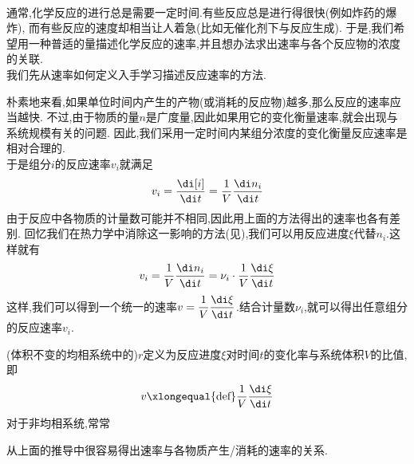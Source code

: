 \documentclass{ctexart}
\begin{document}
\pagestyle{plain}
\noindent{}\vspace{15pt}\\
\indent 通常,化学反应的进行总是需要一定时间.有些反应总是进行得很快(例如炸药的爆炸),%
而有些反应的速度却相当让人着急(比如无催化剂下与反应生成).%
于是,我们希望用一种普适的量描述化学反应的速率,并且想办法求出速率与各个反应物的浓度的关联.\vspace{12pt}\\
\indent 我们先从速率如何定义入手学习描述反应速率的方法.
\begin{derivation}
    朴素地来看,如果单位时间内产生的产物(或消耗的反应物)越多,那么反应的速率应当越快.%
    不过,由于物质的量$n$是广度量,因此如果用它的变化衡量速率,就会出现与系统规模有关的问题.%
    因此,我们采用一定时间内某组分浓度的变化衡量反应速率是相对合理的.\\
    于是组分$i$的反应速率$v_i$就满足
    \[v_i=\dfrac{\di[i]}{\di t}=\dfrac{1}{V}\dfrac{\di n_i}{\di t}\]
    由于反应中各物质的计量数可能并不相同,因此用上面的方法得出的速率也各有差别.%
    回忆我们在热力学中消除这一影响的方法(见),我们可以用反应进度$\xi$代替$n_i$.这样就有
    \[v_i=\dfrac{1}{V}\dfrac{\di n_i}{\di t}=\nu_i\cdot\dfrac{1}{V}\dfrac{\di\xi}{\di t}\]
    这样,我们可以得到一个统一的速率$v=\dfrac{1}{V}\dfrac{\di\xi}{\di t}$.结合计量数$\nu_i$,就可以得出任意组分的反应速率$v_i$.
\end{derivation}
\begin{definition}[7A.1.1 化学反应的速率]
    (体积不变的均相系统中的)$r$定义为反应进度$\xi$对时间$t$的变化率与系统体积$V$的比值,即
    \[v\xlongequal{\text{def}}\dfrac{1}{V}\dfrac{\di\xi}{\di t}\]
    对于非均相系统,常常
\end{definition}
从上面的推导中很容易得出速率与各物质产生/消耗的速率的关系.
\begin{theorem}
    
\end{theorem}
\end{document}
